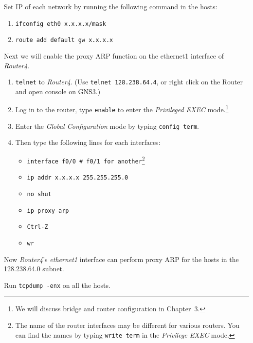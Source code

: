 \documentclass{../UTNetLab}
\begin{document}
    Set IP of each network by running the following command in the hosts:
    \begin{enumerate}
        \item \lstinline[emph={x.x.x.x}]{ifconfig eth0 x.x.x.x/mask}
        \item \lstinline[emph={x.x.x.x}]{route add default gw x.x.x.x}
    \end{enumerate}
    Next we will enable the proxy ARP function on the ethernet1 interface of \textit{Router4}.
    \begin{enumerate}
        \item \lstinline{telnet} to \textit{Router4}. (Use \lstinline{telnet 128.238.64.4}, or right click on the Router and open console on GNS3.)
        \item Log in to the router, type \lstinline[language={cisco}]{enable} to enter the \textit{Privileged EXEC} mode.\footnote{We will discuss bridge and router configuration in Chapter~3.}
        \item Enter the \textit{Global Configuration} mode by typing \lstinline[language={cisco}]{config term}.
        \item Then type the following lines for each interfaces:
        \begin{itemize}
            \item \lstinline[language={cisco}]{interface f0/0 # f0/1 for another}\footnote{The name of the router interfaces may be different for various routers.
            You can find the names by typing \lstinline[language={cisco}]{write term} in the \textit{Privilege EXEC} mode.}
            \item \lstinline[language={cisco}]{ip addr x.x.x.x 255.255.255.0}
            \item \lstinline[language={cisco}]{no shut}
            \item \lstinline[language={cisco}]{ip proxy-arp}
            \item \texttt{Ctrl-Z}
            \item \lstinline[language={cisco}]{wr}
        \end{itemize}
    \end{enumerate}
    
    Now \textit{Router4}’s \textit{ethernet1} interface can perform proxy ARP for the hosts in the 128.238.64.0 subnet.

    Run \lstinline{tcpdump -enx} on all the hosts.
\end{document}
